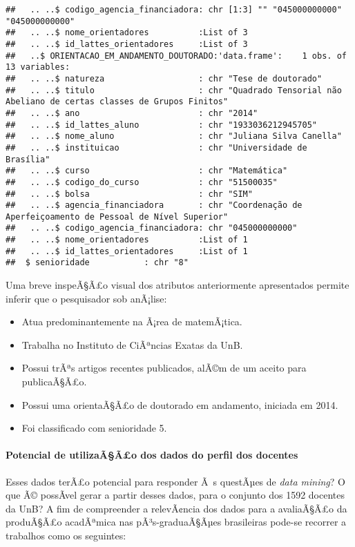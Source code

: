 \documentclass[]{article}
\providecommand{\tightlist}{%
  \setlength{\itemsep}{0pt}\setlength{\parskip}{0pt}}
\let\oldparagraph\paragraph
\renewcommand{\paragraph}[1]{\oldparagraph{#1}\mbox{}}
\begin{document}
\begin{verbatim}
##   .. ..$ codigo_agencia_financiadora: chr [1:3] "" "045000000000" "045000000000"
##   .. ..$ nome_orientadores          :List of 3
##   .. ..$ id_lattes_orientadores     :List of 3
##   ..$ ORIENTACAO_EM_ANDAMENTO_DOUTORADO:'data.frame':    1 obs. of  13 variables:
##   .. ..$ natureza                   : chr "Tese de doutorado"
##   .. ..$ titulo                     : chr "Quadrado Tensorial não Abeliano de certas classes de Grupos Finitos"
##   .. ..$ ano                        : chr "2014"
##   .. ..$ id_lattes_aluno            : chr "1933036212945705"
##   .. ..$ nome_aluno                 : chr "Juliana Silva Canella"
##   .. ..$ instituicao                : chr "Universidade de Brasília"
##   .. ..$ curso                      : chr "Matemática"
##   .. ..$ codigo_do_curso            : chr "51500035"
##   .. ..$ bolsa                      : chr "SIM"
##   .. ..$ agencia_financiadora       : chr "Coordenação de Aperfeiçoamento de Pessoal de Nível Superior"
##   .. ..$ codigo_agencia_financiadora: chr "045000000000"
##   .. ..$ nome_orientadores          :List of 1
##   .. ..$ id_lattes_orientadores     :List of 1
##  $ senioridade           : chr "8"
\end{verbatim}

Uma breve inspeÃ§Ã£o visual dos atributos anteriormente apresentados
permite inferir que o pesquisador sob anÃ¡lise:

\begin{itemize}
\tightlist
\item
  Atua predominantemente na Ã¡rea de matemÃ¡tica.
\item
  Trabalha no Instituto de CiÃªncias Exatas da UnB.
\item
  Possui trÃªs artigos recentes publicados, alÃ©m de um aceito para
  publicaÃ§Ã£o.
\item
  Possui uma orientaÃ§Ã£o de doutorado em andamento, iniciada em 2014.
\item
  Foi classificado com senioridade 5.
\end{itemize}

\paragraph{Potencial de utilizaÃ§Ã£o dos dados do perfil dos
docentes}\label{potencial-de-utilizaaao-dos-dados-do-perfil-dos-docentes}

Esses dados terÃ£o potencial para responder Ã~s questÃµes de \emph{data
mining}? O que Ã© possÃ­vel gerar a partir desses dados, para o conjunto
dos 1592 docentes da UnB? A fim de compreender a relevÃ¢ncia dos dados
para a avaliaÃ§Ã£o da produÃ§Ã£o acadÃªmica nas pÃ³s-graduaÃ§Ãµes
brasileiras pode-se recorrer a trabalhos como os seguintes:
\end{document}
